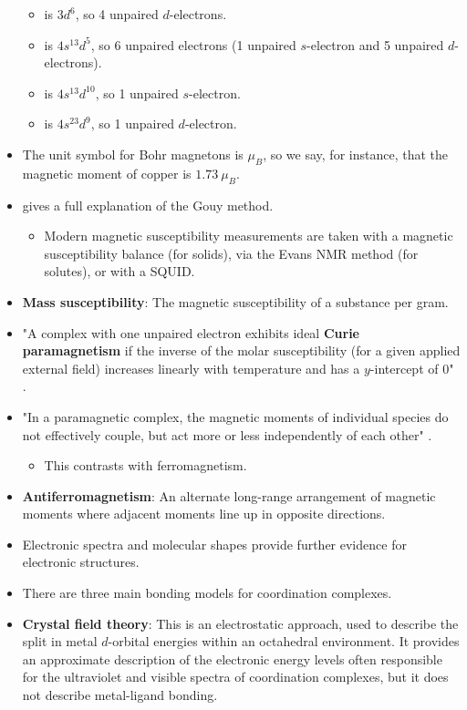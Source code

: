 \documentclass[../notes.tex]{subfiles}
\begin{document}
\begin{itemize}
\begin{itemize}
        \item {} is $3d^6$, so 4 unpaired $d$-electrons.
        \item {} is $4s^13d^5$, so 6 unpaired electrons (1 unpaired $s$-electron and 5 unpaired $d$-electrons).
        \item {} is $4s^13d^{10}$, so 1 unpaired $s$-electron.
        \item {} is $4s^23d^9$, so 1 unpaired $d$-electron.
    \end{itemize}
    \item The unit symbol for Bohr magnetons is $\mu_B$, so we say, for instance, that the magnetic moment of copper is $\SI{1.73}{\mu_B}$.
    \item \textcite{bib:MiesslerFischerTarr} gives a full explanation of the Gouy method.
    \begin{itemize}
        \item Modern magnetic susceptibility measurements are taken with a magnetic susceptibility balance (for solids), via the Evans NMR method (for solutes), or with a SQUID.
    \end{itemize}
    \item \textbf{Mass susceptibility}: The magnetic susceptibility of a substance per gram.
    \item "A complex with one unpaired electron exhibits ideal \textbf{Curie paramagnetism} if the inverse of the molar susceptibility (for a given applied external field) increases linearly with temperature and has a $y$-intercept of 0" \parencite[362]{bib:MiesslerFischerTarr}.
    \item "In a paramagnetic complex, the magnetic moments of individual species do not effectively couple, but act more or less independently of each other" \parencite[362]{bib:MiesslerFischerTarr}.
    \begin{itemize}
        \item This contrasts with ferromagnetism.
    \end{itemize}
    \item \textbf{Antiferromagnetism}: An alternate long-range arrangement of magnetic moments where adjacent moments line up in opposite directions.
    \item Electronic spectra and molecular shapes provide further evidence for electronic structures.
    \item There are three main bonding models for coordination complexes.
    \item \textbf{Crystal field theory}: This is an electrostatic approach, used to describe the split in metal $d$-orbital energies within an octahedral environment. It provides an approximate description of the electronic energy levels often responsible for the ultraviolet and visible spectra of coordination complexes, but it does not describe metal-ligand bonding.

\end{itemize}
\end{document}
